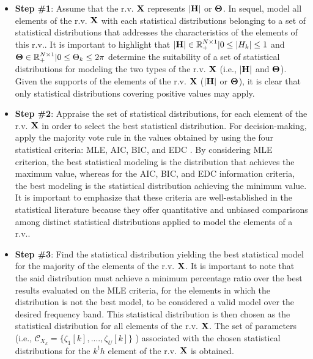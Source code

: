 \begin{itemize}
	\item \textbf{Step \#1}: Assume that the \ac{r.v.} ${\bf X}$ represents ${\bf |H|}$ or ${\bf \Theta}$. In sequel, model all elements of the \ac{r.v.} ${\bf X}$ with each statistical distributions belonging to a set of statistical distributions  that addresses the characteristics of the elements of this  \ac{r.v.}. It is important to highlight that ${\bf |H|} \in \mathbb{R}_{+}^{N\times 1}|0 \leq {  |H_k|} \leq 1$ and ${\bf \Theta \in \mathbb{R}}_{+}^{N \times 1}|0 \leq { \Theta_k} \leq 2\pi$ determine the suitability of a set of statistical distributions for modeling the two types of the \ac{r.v.} ${\bf X}$ (i.e., ${\bf |H|}$ and ${\bf \Theta}$). Given the supports of the elements of the \ac{r.v.} ${\bf X}$ (${\bf |H|}$ or ${\bf \Theta}$), it is clear that only statistical distributions covering positive values may apply.
	
	\item \textbf{Step \#2}: Appraise the set of statistical distributions, for each element of the \ac{r.v.} ${\bf X}$ in order to select the best statistical distribution. For decision-making, apply the majority vote rule \cite{vote} in the values obtained by using the four statistical criteria: \ac{MLE}, \ac{AIC}, \ac{BIC}, and \ac{EDC} \cite{Dorea:Sim,Cabral:Multi,Andrei:Meas}. By considering \ac{MLE} criterion, the best statistical modeling is the distribution that achieves the maximum value, whereas for the \ac{AIC}, \ac{BIC}, and \ac{EDC} information criteria, the best modeling is the statistical distribution achieving the minimum value. It is important to emphasize that these criteria are well-established in the statistical literature because they offer quantitative and unbiased comparisons among distinct statistical distributions applied to model the elements of a \ac{r.v.}.
	
	\item \textbf{Step \#3}: Find the statistical distribution yielding the best statistical model for the majority of the elements of the \ac{r.v.} ${\bf X}$. It is important to note that the said distribution must achieve a minimum percentage ratio over the best results evaluated on the \ac{MLE} criteria, for the elements in which the distribution is not the best model, to be considered a valid model over the desired frequency band. This statistical distribution is then chosen as the statistical distribution for all elements of the \ac{r.v.} ${\bf X}$. The set of parameters (i.e., $\mathcal{C}_{X_k} = \{ \zeta_{1}[k], ...., \zeta_{U}[k] \}$ ) associated with the chosen statistical distributions for the $k^th$ element of the \ac{r.v.} $\bf X$ is obtained.  
\end{itemize}

